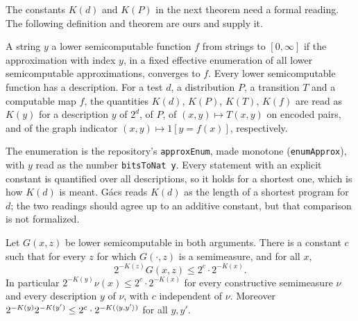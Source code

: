 The constants \( K(d) \) and \( K(P) \) in the next theorem need a formal reading. The
following definition and theorem are ours and supply it.

\begin{ourdefinition}
  \label{def:ch2-description}
  \leanok
A string \( y \)  a lower semicomputable function \( f \) from strings to
\( [0,\infty] \) if the approximation with index \( y \), in a fixed effective enumeration of
all lower semicomputable approximations, converges to \( f \). Every lower semicomputable
function has a description. For a test \( d \), a distribution \( P \), a transition \( T \)
and a computable map \( f \), the quantities \( K(d) \), \( K(P) \), \( K(T) \), \( K(f) \) are
read as \( K(y) \) for a description \( y \) of \( 2^{d} \), of \( P \), of
\( (x,y) \mapsto T(x,y) \) on encoded pairs, and of the graph indicator
\( (x,y) \mapsto 1[y = f(x)] \), respectively.
\end{ourdefinition}
\begin{definedinlean}\leanok\end{definedinlean}

\begin{formalization}
The enumeration is the repository's \texttt{approxEnum}, made monotone (\texttt{enumApprox}),
with \( y \) read as the number \texttt{bitsToNat y}. Every statement with an explicit
constant is quantified over all descriptions, so it holds for a shortest one, which is how
\( K(d) \) is meant. G\'acs reads \( K(d) \) as the length of a shortest program for \( d \);
the two readings should agree up to an additive constant, but that comparison is not
formalized.
\end{formalization}

\begin{ourtheorem}
  \label{thm:ch2-exact-domination}
  \leanok
Let \( G(x,z) \) be lower semicomputable in both arguments. There is a constant \( c \) such
that for every \( z \) for which \( G(\cdot,z) \) is a semimeasure, and for all \( x \),
 \[
   2^{-K(z)} G(x,z) \le 2^{c} \cdot 2^{-K(x)}.
 \]
In particular \( 2^{-K(y)} \nu(x) \le 2^{c} \cdot 2^{-K(x)} \) for every constructive
semimeasure \( \nu \) and every description \( y \) of \( \nu \), with \( c \) independent of
\( \nu \). Moreover \( 2^{-K(y)} 2^{-K(y')} \le 2^{c} \cdot 2^{-K({\mathopen\langle y,y'\mathclose\rangle})} \) for all
\( y, y' \).
\end{ourtheorem}

